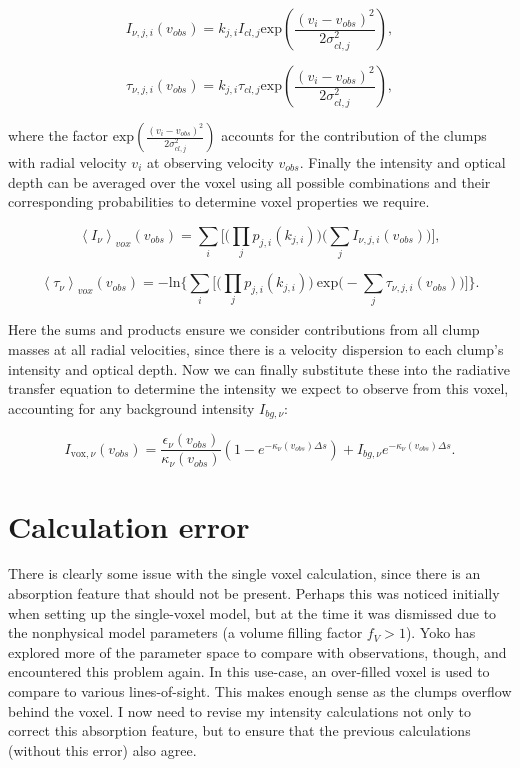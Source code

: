 \documentclass[a4paper]{article}
\begin{document}
    \[
    I_{\nu,j,i} (v_{obs}) = k_{j,i} I_{cl,j} \mathrm{exp} \left( \frac{(v_i-v_{obs})^2}{2\sigma_{cl, j}^2} \right),
    \]

    \[
    \tau_{\nu,j,i} (v_{obs}) = k_{j,i} \tau_{cl,j} \mathrm{exp} \left( \frac{(v_i-v_{obs})^2}{2\sigma_{cl, j}^2} \right),
    \]

    where the factor \(\mathrm{exp}(\frac{(v_i - v_{obs})^2}{2 \sigma_{cl, j}^2})\) accounts for the contribution of the clumps with radial velocity \(v_i\) at observing velocity \(v_{obs}\).
    Finally the intensity and optical depth can be averaged over the voxel using all possible combinations and their corresponding probabilities to determine voxel properties we require.

    \[
    \left< I_\nu \right>_{vox} (v_{obs}) = \sum_i \bigg[ \Big( \prod_j p_{j,i}(k_{j,i}) \Big) \Big( \sum_j I_{\nu,j,i} (v_{obs}) \Big) \bigg],
    \]

    \[
    \left< \tau_\nu \right>_{vox} (v_{obs}) = -\mathrm{ln} \Bigg\{ \sum_i \bigg[ \Big( \prod_j p_{j,i}(k_{j,i}) \Big) \ \mathrm{exp} \Big( - \sum_j \tau_{\nu,j,i} (v_{obs}) \Big) \bigg] \Bigg\}.
    \]

    Here the sums and products ensure we consider contributions from all clump masses at all radial velocities, since there is a velocity dispersion to each clump's intensity and optical depth.
    Now we can finally substitute these into the radiative transfer equation to determine the intensity we expect to observe from this voxel, accounting for any background intensity \(I_{bg, \nu}\):

    \[
    I_{\mathrm{vox},\nu} (v_{obs}) = \frac{\epsilon_\nu (v_{obs})}{\kappa_\nu (v_{obs})} \left( 1 - e^{-\kappa_\nu (v_{obs}) \Delta s} \right) + I_{bg, \nu} e^{-\kappa_\nu (v_{obs}) \Delta s}.
    \]

    \pagebreak

    \section{Calculation error}

    There is clearly some issue with the single voxel calculation, since there is an absorption feature that should not be present.
    Perhaps this was noticed initially when setting up the single-voxel model, but at the time it was dismissed due to the nonphysical model parameters (a volume filling factor \(f_V > 1\)).
    Yoko has explored more of the parameter space to compare with observations, though, and encountered this problem again.
    In this use-case, an over-filled voxel is used to compare to various lines-of-sight.
    This makes enough sense as the clumps overflow behind the voxel.
    I now need to revise my intensity calculations not only to correct this absorption feature, but to ensure that the previous calculations (without this error) also agree.
\end{document}
